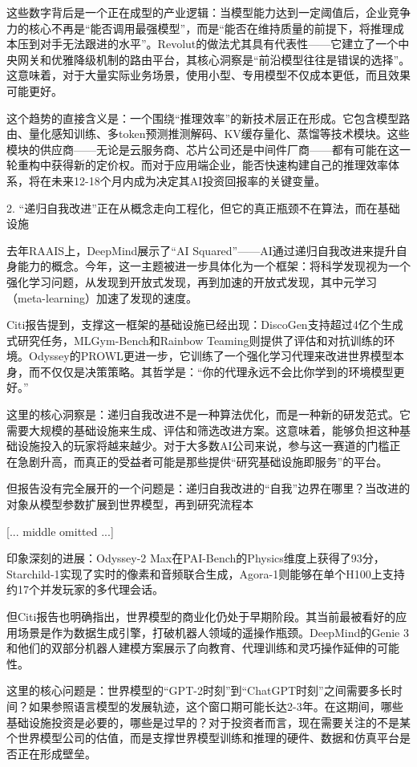 \documentclass[11pt]{ctexart}
\begin{document}
这些数字背后是一个正在成型的产业逻辑：当模型能力达到一定阈值后，企业竞争力的核心不再是“能否调用最强模型”，而是“能否在维持质量的前提下，将推理成本压到对手无法跟进的水平”。Revolut的做法尤其具有代表性——它建立了一个中央网关和优雅降级机制的路由平台，其核心洞察是“前沿模型往往是错误的选择”。这意味着，对于大量实际业务场景，使用小型、专用模型不仅成本更低，而且效果可能更好。

这个趋势的直接含义是：一个围绕“推理效率”的新技术层正在形成。它包含模型路由、量化感知训练、多token预测推测解码、KV缓存量化、蒸馏等技术模块。这些模块的供应商——无论是云服务商、芯片公司还是中间件厂商——都有可能在这一轮重构中获得新的定价权。而对于应用端企业，能否快速构建自己的推理效率体系，将在未来12-18个月内成为决定其AI投资回报率的关键变量。

2. “递归自我改进”正在从概念走向工程化，但它的真正瓶颈不在算法，而在基础设施

去年RAAIS上，DeepMind展示了“AI Squared”——AI通过递归自我改进来提升自身能力的概念。今年，这一主题被进一步具体化为一个框架：将科学发现视为一个强化学习问题，从发现到开放式发现，再到加速的开放式发现，其中元学习（meta-learning）加速了发现的速度。

Citi报告提到，支撑这一框架的基础设施已经出现：DiscoGen支持超过4亿个生成式研究任务，MLGym-Bench和Rainbow Teaming则提供了评估和对抗训练的环境。Odyssey的PROWL更进一步，它训练了一个强化学习代理来改进世界模型本身，而不仅仅是决策策略。其哲学是：“你的代理永远不会比你学到的环境模型更好。”

这里的核心洞察是：递归自我改进不是一种算法优化，而是一种新的研发范式。它需要大规模的基础设施来生成、评估和筛选改进方案。这意味着，能够负担这种基础设施投入的玩家将越来越少。对于大多数AI公司来说，参与这一赛道的门槛正在急剧升高，而真正的受益者可能是那些提供“研究基础设施即服务”的平台。

但报告没有完全展开的一个问题是：递归自我改进的“自我”边界在哪里？当改进的对象从模型参数扩展到世界模型，再到研究流程本

[... middle omitted ...]

印象深刻的进展：Odyssey-2 Max在PAI-Bench的Physics维度上获得了93分，Starchild-1实现了实时的像素和音频联合生成，Agora-1则能够在单个H100上支持约17个并发玩家的多代理会话。

但Citi报告也明确指出，世界模型的商业化仍处于早期阶段。其当前最被看好的应用场景是作为数据生成引擎，打破机器人领域的遥操作瓶颈。DeepMind的Genie 3和他们的双部分机器人建模方案展示了向教育、代理训练和灵巧操作延伸的可能性。

这里的核心问题是：世界模型的“GPT-2时刻”到“ChatGPT时刻”之间需要多长时间？如果参照语言模型的发展轨迹，这个窗口期可能长达2-3年。在这期间，哪些基础设施投资是必要的，哪些是过早的？对于投资者而言，现在需要关注的不是某个世界模型公司的估值，而是支撑世界模型训练和推理的硬件、数据和仿真平台是否正在形成壁垒。
\end{document}
